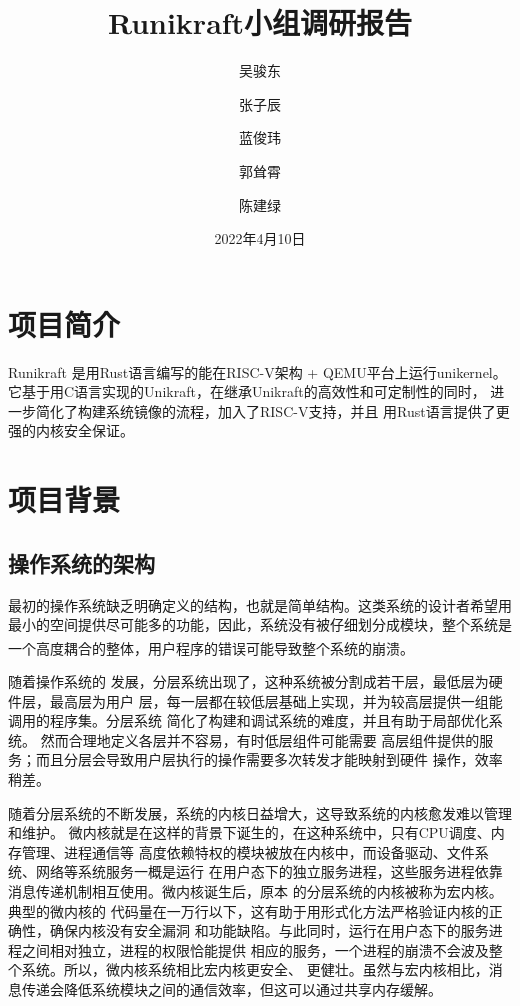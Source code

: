 \documentclass[UTF8,fontset=none,linespread=1.15]{ctexart}
\let\nosupcite\cite
\renewcommand*{\cite}[1]{\textsuperscript{\nosupcite{#1}}}
\renewcommand{\today}{2022年4月10日}
\begin{document}
\sffamily %
\title{\bfseries Runikraft小组\quad 调研报告}
\author{吴骏东\and 张子辰\and 蓝俊玮\and 郭耸霄\and 陈建绿}
\date{\today}
\maketitle

\tableofcontents

\section{项目简介}
Runikraft 是用Rust语言编写的能在RISC-V架构 + QEMU平台上运行unikernel。
它基于用C语言实现的Unikraft，在继承Unikraft的高效性和可定制性的同时，
进一步简化了构建系统镜像的流程，加入了RISC-V支持，并且
用Rust语言提供了更强的内核安全保证。
\section{项目背景}
\subsection{操作系统的架构}
最初的操作系统缺乏明确定义的结构，也就是简单结构。这类系统的设计者希望用
最小的空间提供尽可能多的功能，因此，系统没有被仔细划分成模块，整个系统是
一个高度耦合的整体，用户程序的错误可能导致整个系统的崩溃。\cite{bib:os-concept}

随着操作系统的
发展，分层系统出现了，这种系统被分割成若干层，最低层为硬件层，最高层为用户
层，每一层都在较低层基础上实现，并为较高层提供一组能调用的程序集。分层系统
简化了构建和调试系统的难度，并且有助于局部优化系统。
然而合理地定义各层并不容易，有时低层组件可能需要
高层组件提供的服务；而且分层会导致用户层执行的操作需要多次转发才能映射到硬件
操作，效率稍差。

随着分层系统的不断发展，系统的内核日益增大，这导致系统的内核愈发难以管理和维护。
微内核就是在这样的背景下诞生的，在这种系统中，只有CPU调度、内存管理、进程通信等
高度依赖特权的模块被放在内核中，而设备驱动、文件系统、网络等系统服务一概是运行
在用户态下的独立服务进程，这些服务进程依靠消息传递机制相互使用。微内核诞生后，原本
的分层系统的内核被称为宏内核。典型的微内核的
代码量在一万行以下，这有助于用形式化方法严格验证内核的正确性，确保内核没有安全漏洞
和功能缺陷。与此同时，运行在用户态下的服务进程之间相对独立，进程的权限恰能提供
相应的服务，一个进程的崩溃不会波及整个系统。所以，微内核系统相比宏内核更安全、
更健壮。虽然与宏内核相比，消息传递会降低系统模块之间的通信效率，但这可以通过共享内存缓解。
\end{document}
